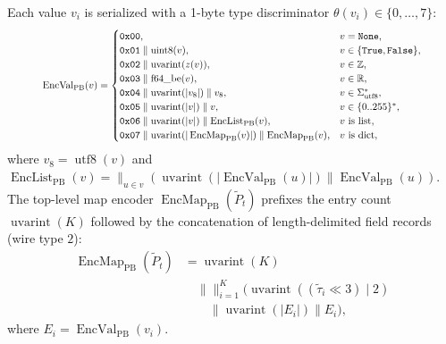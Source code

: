 \documentclass[conference,10pt]{IEEEtran}
\begin{document}
Each value $v_i$ is serialized with a 1-byte type discriminator $\theta(v_i) \in \{0, \dots, 7\}$:
\begin{equation}
\label{eq:pb_val_grammar}
\resizebox{0.88\columnwidth}{!}{$\displaystyle
\operatorname{EncVal}_{\text{PB}}(v) = \begin{cases}
\mathtt{0x00}, & v = \texttt{None}, \\
\mathtt{0x01} \parallel \operatorname{uint8}(v), & v \in \{\texttt{True}, \texttt{False}\}, \\
\mathtt{0x02} \parallel \operatorname{uvarint}(z(v)), & v \in \mathbb{Z}, \\
\mathtt{0x03} \parallel \operatorname{f64\_be}(v), & v \in \mathbb{R}, \\
\mathtt{0x04} \parallel \operatorname{uvarint}(|v_8|) \parallel v_8, & v \in \Sigma_{\text{utf8}}^*, \\
\mathtt{0x05} \parallel \operatorname{uvarint}(|v|) \parallel v, & v \in \{0..255\}^*, \\
\mathtt{0x06} \parallel \operatorname{uvarint}(|v|) \parallel \operatorname{EncList}_{\text{PB}}(v), & v \text{ is list}, \\
\mathtt{0x07} \parallel \operatorname{uvarint}(|\operatorname{EncMap}_{\text{PB}}(v)|) \parallel \operatorname{EncMap}_{\text{PB}}(v), & v \text{ is dict},
\end{cases}
$}
\end{equation}
where $v_8 = \operatorname{utf8}(v)$ and $\operatorname{EncList}_{\text{PB}}(v) = \big\|_{u \in v} (\operatorname{uvarint}(|\operatorname{EncVal}_{\text{PB}}(u)|) \parallel \operatorname{EncVal}_{\text{PB}}(u))$. The top-level map encoder $\operatorname{EncMap}_{\text{PB}}(\tilde{P}_t)$ prefixes the entry count $\operatorname{uvarint}(K)$ followed by the concatenation of length-delimited field records (wire type $2$):
\begin{equation}
\label{eq:pb_map_grammar}
\begin{aligned}
\operatorname{EncMap}_{\text{PB}}(\tilde{P}_t) &= \operatorname{uvarint}(K) \\
&\quad \parallel \big\|_{i=1}^K \Big( \operatorname{uvarint}\left((\tilde{\tau}_i \ll 3) \mid 2\right) \\
&\qquad \parallel \operatorname{uvarint}\left(|E_i|\right) \parallel E_i \Big),
\end{aligned}
\end{equation}
where $E_i = \operatorname{EncVal}_{\text{PB}}(v_i)$.
\end{document}
